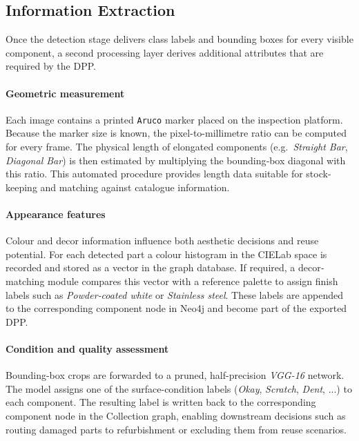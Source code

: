 \documentclass[3p,times,procedia]{elsarticle}
\begin{document}
\subsection{Information Extraction}
\label{sec:info-extraction}

Once the detection stage delivers class labels and bounding boxes for every visible component, a second processing layer derives additional attributes that are required by the DPP.

\paragraph{Geometric measurement}
Each image contains a printed \texttt{Aruco} marker placed on the inspection platform.  
Because the marker size is known, the pixel-to-millimetre ratio can be computed for every frame.  
The physical length of elongated components (e.g.\ \emph{Straight Bar}, \emph{Diagonal Bar}) is then estimated by multiplying the bounding‐box diagonal with this ratio.  
This automated procedure provides length data suitable for stock-keeping and matching against catalogue information.

\paragraph{Appearance features}
Colour and decor information influence both aesthetic decisions and reuse potential.  
For each detected part a colour histogram in the CIE\-Lab space is recorded and stored as a vector in the graph database.  
If required, a decor‐matching module compares this vector with a reference palette to assign finish labels such as \textit{Powder‐coated white} or \textit{Stainless steel}.  These labels are appended to the corresponding component node in Neo4j and become part of the exported DPP.

\paragraph{Condition and quality assessment}
Bounding-box crops are forwarded to a pruned, half-precision \emph{VGG-16} network.  
The model assigns one of the surface-condition labels (\textit{Okay}, \textit{Scratch}, \textit{Dent}, ...) to each component.  
The resulting label is written back to the corresponding component node in the Collection graph, enabling downstream decisions such as routing damaged parts to refurbishment or excluding them from reuse scenarios.
\end{document}

